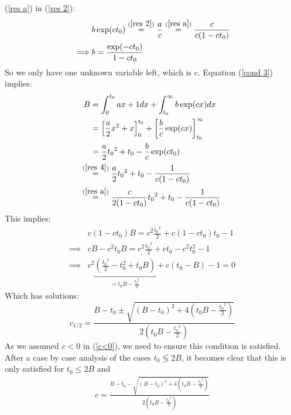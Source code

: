 \documentclass[11pt, a4paper]{article}
\makeatletter
\newcommand*{\sm@shstack}[3][lr]{
	\mathrel{%
		\smashoperator[#1]{\mathop{#2}^{#3}}}
}
\newcommand*{\lx@rrow}[2]{ %
	\sm@shstack[l]{#2}{#1}
}
\newcommand*{\lxeq}[1]{\lx@rrow{#1}{=}} %
\makeatother
\begin{document}
    \noindent (\ref{res a}) in (\ref{res 2}):
    \begin{align}
        &b\exp(c t_0)\stackrel{(\ref{res 2})}=\frac{a}{c}\stackrel{(\ref{res a})}{=} \frac{c}{c(1-ct_0)}\nonumber\\
        \implies & b = \frac{\exp(-ct_0)}{1-ct_0} \label{res 4}
    \end{align}
    So we only have one unknown variable left, which is c. Equation (\ref{cond 3}) implies:
    \begin{align}
        B &= \int_0^{t_0} a x+1 dx + \int_{t_0}^\infty b\exp(cx)dx 
        \nonumber\\
        &= \left[\frac{a}{2}x^2 +x\right]_0^{t_0} + \left[\frac{b}{c} \exp(cx)\right]_{t_0}^\infty 
        \nonumber\\
        &=\frac{a}{2}{t_0}^2 +t_0- \frac{b}{c}\exp(c t_0)
        \label{c<0}\\
        &\lxeq{(\ref{res 4})} \frac{a}{2}{t_0}^2 +t_0-\frac{1}{c(1-ct_0)}
        \nonumber \\
        &\lxeq{(\ref{res a})} \frac{c}{2(1-ct_0)}{t_0}^2 +t_0-\frac{1}{c(1-ct_0)} \nonumber
    \end{align}
    This implies:
    \begin{align*}
        &c(1-c t_0) B = c^2 \frac{{t_0}^2}{2} + c(1-c t_0)t_0 -1\\
        \implies & cB - c^2t_0B = c^2\frac{{t_0}^2}{2} + ct_0 - c^2t_0^2 -1\\
        \implies & c^2 \underbracket{\left(\frac{{t_0}^2}{2} - t_0^2 + t_0B\right)}_{= t_0 B - \frac{{t_0}^2}{2}} 
        + c\left(t_0 -B \right) -1 = 0
    \end{align*}
    Which has solutions:
    \[
        c_{1/2} = \frac{B-t_0 \pm \sqrt{(B-t_0)^2 + 4 \left(t_0 B - \frac{{t_0}^2}{2}\right)}}{2 \left(t_0 B - \frac{{t_0}^2}{2}\right)}
    \]
    As we assumed \(c<0\) in (\ref{c<0}), we need to ensure this condition is satisfied. After a case by case analysis of the cases \(t_0 \lessgtr 2B\), it becomes clear that this is only satisfied for \(t_0\le 2B\) and
    \begin{align}
        c = \frac{B-t_0 - \sqrt{(B-t_0)^2 + 4 \left(t_0 B - \frac{{t_0}^2}{2}\right)}}{2 \left(t_0 B - \frac{{t_0}^2}{2}\right)} \label{res c}
    \end{align}
\end{document}
